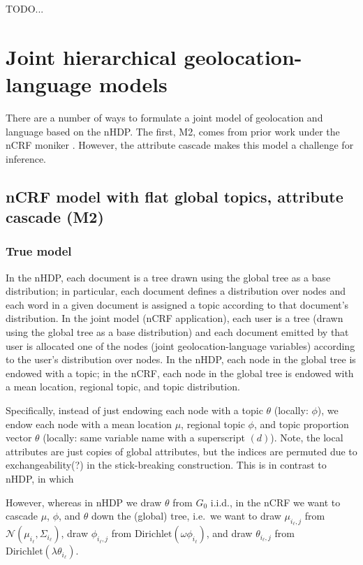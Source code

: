 \documentclass{article}
\newcommand{\Dirichlet}{\ensuremath{\mathrm{Dirichlet}}}
\newcommand{\Normal}{\ensuremath{\mathcal{N}}}
\begin{document}
TODO...



\section*{Joint hierarchical geolocation-language models}

There are a number of ways to formulate a joint model of geolocation and language based on the nHDP.  The first, M2, comes from prior work under the nCRF moniker \cite{ahmed2013,ahmed2013a}.  However, the attribute cascade makes this model a challenge for inference.

\subsection*{nCRF model with flat global topics, attribute cascade (M2)}

\subsubsection*{True model}

In the nHDP, each document is a tree drawn using the global tree as a base distribution; in particular, each document defines a distribution over nodes and each word in a given document is assigned a topic according to that document's distribution.  In the joint model (nCRF application), each user is a tree (drawn using the global tree as a base distribution) and each document emitted by that user is allocated one of the nodes (joint geolocation-language variables) according to the user's distribution over nodes.  In the nHDP, each node in the global tree is endowed with a topic; in the nCRF, each node in the global tree is endowed with a mean location, regional topic, and topic distribution.

Specifically, instead of just endowing each node with a topic $\theta$ (locally: $\phi$), we endow each node with a mean location $\mu$, regional topic $\phi$, and topic proportion vector $\theta$ (locally: same variable name with a superscript $(d)$).  Note, the local attributes are just copies of global attributes, but the indices are permuted due to exchangeability(?) in the stick-breaking construction.  This is in contrast to nHDP, in which

However, whereas in nHDP we draw $\theta$ from $G_0$ i.i.d., in the nCRF we want to cascade $\mu$, $\phi$, and $\theta$ down the (global) tree, i.e.\ we want to draw $\mu_{i_\ell,j}$ from $\Normal(\mu_{i_\ell}, \Sigma_{i_\ell})$, draw $\phi_{i_\ell,j}$ from $\Dirichlet(\omega \phi_{i_\ell})$, and draw $\theta_{i_\ell,j}$ from $\Dirichlet(\lambda \theta_{i_\ell})$.
\end{document}
